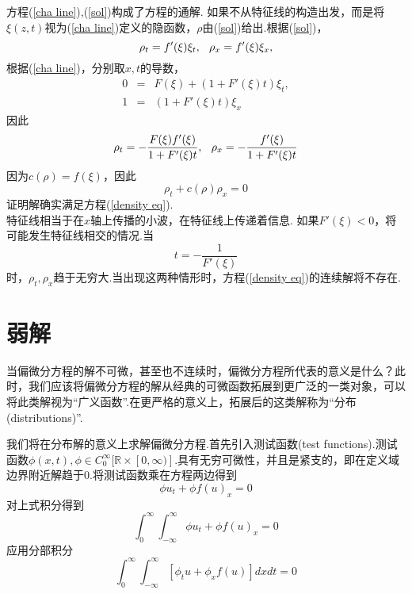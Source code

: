 	方程(\ref{cha line}),(\ref{sol})构成了方程的通解.
	如果不从特征线的构造出发，而是将$\xi(z,t)$视为(\ref{cha line})定义的隐函数，$\rho$由(\ref{sol})给出.根据(\ref{sol})，
	\begin{equation*}
		\rho_t = f'(\xi)\xi_t,\hspace{0.1in} \rho_x = f'(\xi)\xi_x,
	\end{equation*}
	根据(\ref{cha line})，分别取$x,t$的导数，
	\begin{eqnarray*}
		0 &=& F(\xi) + (1+F'(\xi)t)\xi_t, \\
		1 &=& (1+F'(\xi)t)\xi_x
	\end{eqnarray*}
	因此
	\begin{equation*}
		\rho_t = -\frac{F(\xi)f'(\xi)}{1+F'(\xi)t},\hspace{0.1in} \rho_x = -\frac{f'(\xi)}{1+F'(\xi)t}
	\end{equation*}
	因为$c(\rho)=f(\xi)$，因此
	\begin{equation*}
		\rho_t + c(\rho)\rho_x=0
	\end{equation*}
	证明解确实满足方程(\ref{density eq}).\\
	特征线相当于在$x$轴上传播的小波，在特征线上传递着信息.
	如果$F'(\xi)<0$，将可能发生特征线相交的情况.当\begin{equation}
		t = -\frac{1}{F'(\xi)}
	\end{equation}
	时，$\rho_t,\rho_x$趋于无穷大.当出现这两种情形时，方程(\ref{density eq})的连续解将不存在.
	
\section{弱解}

当偏微分方程的解不可微，甚至也不连续时，偏微分方程所代表的意义是什么？此时，我们应该将偏微分方程的解从经典的可微函数拓展到更广泛的一类对象，可以将此类解视为“广义函数”.在更严格的意义上，拓展后的这类解称为“分布(distributions)”.

我们将在分布解的意义上求解偏微分方程.首先引入测试函数(test functions).测试函数$\phi(x,t), \phi \in C_0^{\infty}[\mathbb{R}\times [0,\infty)]$.具有无穷可微性，并且是紧支的，即在定义域边界附近解趋于0.将测试函数乘在方程两边得到
	\begin{equation} \label{scl}
		\phi u_t + \phi f(u)_x = 0
	\end{equation}
对上式积分得到
	\begin{equation}
		\int_0^{\infty}\int_{-\infty}^{\infty}\phi u_t + \phi f(u)_x = 0
	\end{equation}
应用分部积分
	\begin{equation}\label{weak sol}
		\int_0^{\infty}\int_{-\infty}^{\infty}[\phi_t u + \phi_x f(u)]dxdt = 0	
	\end{equation}
	
